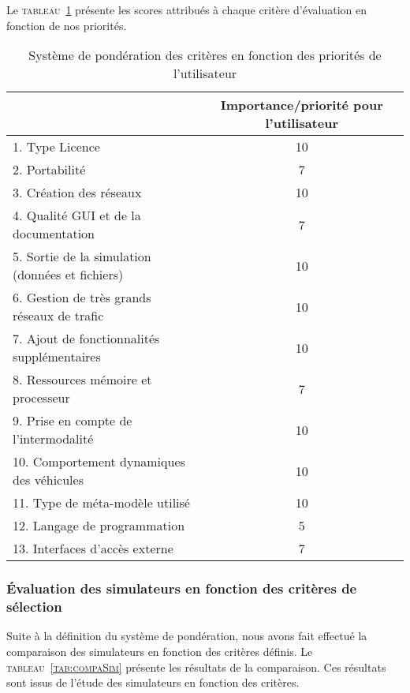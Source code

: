Le \textsc{tableau~\ref{tab:pondCrit}} présente les scores attribués à chaque critère d'évaluation en fonction de nos priorités.

\begin{table}[!ht]
\begin{center}
\caption{Système de pondération des critères en fonction des priorités de l'utilisateur \label{tab:pondCrit}}
\begin{tabular}{|l|c|}
\hline
 \textbf{}  & \footnotesize \textbf{Importance/priorité pour l'utilisateur} 
\\
\hline
 {\footnotesize 1. Type Licence}  & \footnotesize 10 
 \\ 
\hline
\footnotesize 2. Portabilité   & \footnotesize 7
\\ 
\hline
\footnotesize 3. Création des réseaux  & \footnotesize 10
\\ 
\hline
\footnotesize 4. Qualité GUI et de la documentation  & \footnotesize 7
\\ 
\hline
\footnotesize 5. Sortie de la simulation (données et fichiers)  & \footnotesize  10
\\ 
\hline
\footnotesize 6. Gestion de très grands réseaux de trafic & \footnotesize  10
\\ 
\hline
\footnotesize 7. Ajout de fonctionnalités supplémentaires  & \footnotesize 10
\\ 
\hline
\footnotesize 8. Ressources mémoire et processeur  & \footnotesize  7
\\ 
\hline
\footnotesize 9. Prise en compte de l'intermodalité   & \footnotesize 10
\\ 
\hline
\footnotesize 10. Comportement dynamiques des véhicules  & \footnotesize 10
\\ 
\hline
\footnotesize 11. Type de méta-modèle utilisé   & \footnotesize  10
\\ 
\hline
\footnotesize 12. Langage de programmation  & \footnotesize 5
\\
\hline
\footnotesize 13. Interfaces d’accès externe & \footnotesize 7
\\
\hline
\end{tabular}
\end{center}
\end{table}

\subsubsection{Évaluation des simulateurs en fonction des critères de sélection}
Suite à la définition du système de pondération, nous avons fait effectué la comparaison des simulateurs en fonction des critères définis. Le \textsc{tableau~\ref{tab:compaSim}} présente les résultats de la comparaison. Ces résultats sont issus de l'étude des simulateurs en fonction des critères.


